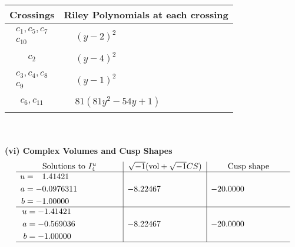 \documentclass[1p]{elsarticle_modified}
\theoremstyle{definition}
\newcommand{\I}{\sqrt{-1}}
\begin{document}
\begin{tabular}{m{50pt}|m{274pt}}
Crossings & \hspace{64pt}Riley Polynomials at each crossing \\
\hline $$\begin{aligned}c_{1},c_{5},c_{7}\\c_{10}\end{aligned}$$&$\begin{aligned}
&(y-2)^2
\end{aligned}$\\
\hline $$\begin{aligned}c_{2}\end{aligned}$$&$\begin{aligned}
&(y-4)^2
\end{aligned}$\\
\hline $$\begin{aligned}c_{3},c_{4},c_{8}\\c_{9}\end{aligned}$$&$\begin{aligned}
&(y-1)^2
\end{aligned}$\\
\hline $$\begin{aligned}c_{6},c_{11}\end{aligned}$$&$\begin{aligned}
&81(81 y^2-54 y+1)
\end{aligned}$\\
\hline
\end{tabular}\\~\\
\newpage\flushleft \textbf{(vi) Complex Volumes and Cusp Shapes}
$$\begin{array}{c|c|c}  
\text{Solutions to }I^u_{4}& \I (\text{vol} + \sqrt{-1}CS) & \text{Cusp shape}\\
 \hline 
\begin{aligned}
u &= \phantom{-}1.41421\phantom{ +0.000000I} \\
a &= -0.0976311\phantom{ +0.000000I} \\
b &= -1.00000\phantom{ +0.000000I}\end{aligned}
 & -8.22467\phantom{ +0.000000I} & -20.0000\phantom{ +0.000000I} \\ \hline\begin{aligned}
u &= -1.41421\phantom{ +0.000000I} \\
a &= -0.569036\phantom{ +0.000000I} \\
b &= -1.00000\phantom{ +0.000000I}\end{aligned}
 & -8.22467\phantom{ +0.000000I} & -20.0000\phantom{ +0.000000I}\\
 \hline 
 \end{array}$$\newpage\newpage\renewcommand{\arraystretch}{1}
\end{document}
